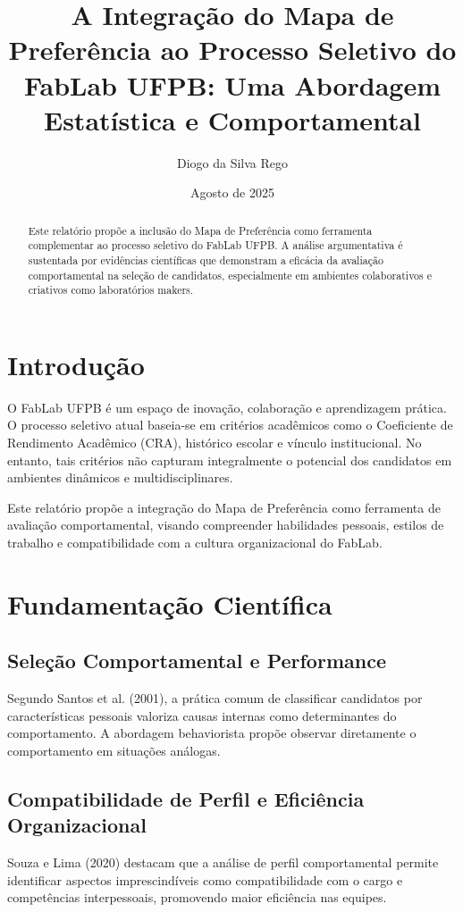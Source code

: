 \documentclass[12pt]{article}
\title{A Integração do Mapa de Preferência ao Processo Seletivo do FabLab UFPB: Uma Abordagem Estatística e Comportamental}
\author{Diogo da Silva Rego}
\date{Agosto de 2025}
\begin{document}
\maketitle

\begin{abstract}
Este relatório propõe a inclusão do Mapa de Preferência como ferramenta complementar ao processo seletivo do FabLab UFPB. A análise argumentativa é sustentada por evidências científicas que demonstram a eficácia da avaliação comportamental na seleção de candidatos, especialmente em ambientes colaborativos e criativos como laboratórios makers.
\end{abstract}

\section{Introdução}
O FabLab UFPB é um espaço de inovação, colaboração e aprendizagem prática. O processo seletivo atual baseia-se em critérios acadêmicos como o Coeficiente de Rendimento Acadêmico (CRA), histórico escolar e vínculo institucional. No entanto, tais critérios não capturam integralmente o potencial dos candidatos em ambientes dinâmicos e multidisciplinares.

Este relatório propõe a integração do Mapa de Preferência como ferramenta de avaliação comportamental, visando compreender habilidades pessoais, estilos de trabalho e compatibilidade com a cultura organizacional do FabLab.

\section{Fundamentação Científica}
\subsection{Seleção Comportamental e Performance}
Segundo Santos et al. (2001), a prática comum de classificar candidatos por características pessoais valoriza causas internas como determinantes do comportamento. A abordagem behaviorista propõe observar diretamente o comportamento em situações análogas.

\subsection{Compatibilidade de Perfil e Eficiência Organizacional}
Souza e Lima (2020) destacam que a análise de perfil comportamental permite identificar aspectos imprescindíveis como compatibilidade com o cargo e competências interpessoais, promovendo maior eficiência nas equipes.
\end{document}
